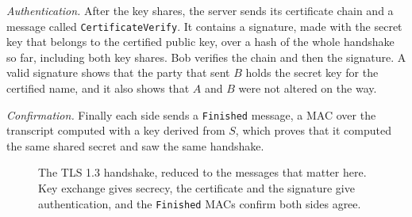 \documentclass[11pt,a4paper]{article}
\theoremstyle{definition}
\newcommand{\Sign}{\mathsf{Sign}}
\newcommand{\sk}{\mathit{sk}}
\newcommand{\Hash}{H}
\begin{document}
\emph{Authentication.} After the key shares, the server sends its certificate chain and a message called \texttt{CertificateVerify}. It contains a signature, made with the secret key that belongs to the certified public key, over a hash of the whole handshake so far, including both key shares. Bob verifies the chain and then the signature. A valid signature shows that the party that sent $B$ holds the secret key for the certified name, and it also shows that $A$ and $B$ were not altered on the way.

\emph{Confirmation.} Finally each side sends a \texttt{Finished} message, a MAC over the transcript computed with a key derived from $S$, which proves that it computed the same shared secret and saw the same handshake.

\begin{figure}[h]
\centering
{}
\caption{The TLS 1.3 handshake, reduced to the messages that matter here. Key exchange gives secrecy, the certificate and the signature give authentication, and the \texttt{Finished} MACs confirm both sides agree.}
\end{figure}
\end{document}
